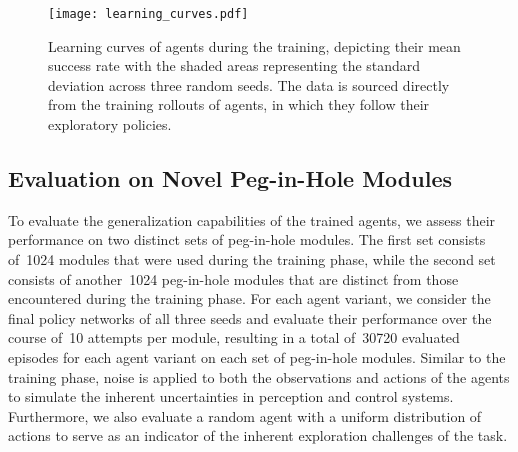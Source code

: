 \begin{figure}[ht]
    \centering
    \texttt{[image: learning\_curves.pdf]}
    \caption{Learning curves of agents during the training, depicting their mean success rate with the shaded areas representing the standard deviation across three random seeds. The data is sourced directly from the training rollouts of agents, in which they follow their exploratory policies.}
    \label{fig:learning-curves}
\end{figure}


\subsection{Evaluation on Novel Peg-in-Hole Modules}\label{ssec:evaluation-on-novel-peg-in-hole-modules}

To evaluate the generalization capabilities of the trained agents, we assess their performance on two distinct sets of peg-in-hole modules. The first set consists of~1024 modules that were used during the training phase, while the second set consists of another~1024 peg-in-hole modules that are distinct from those encountered during the training phase. For each agent variant, we consider the final policy networks of all three seeds and evaluate their performance over the course of~10 attempts per module, resulting in a total of~30720 evaluated episodes for each agent variant on each set of peg-in-hole modules. Similar to the training phase, noise is applied to both the observations and actions of the agents to simulate the inherent uncertainties in perception and control systems. Furthermore, we also evaluate a random agent with a uniform distribution of actions to serve as an indicator of the inherent exploration challenges of the task.

